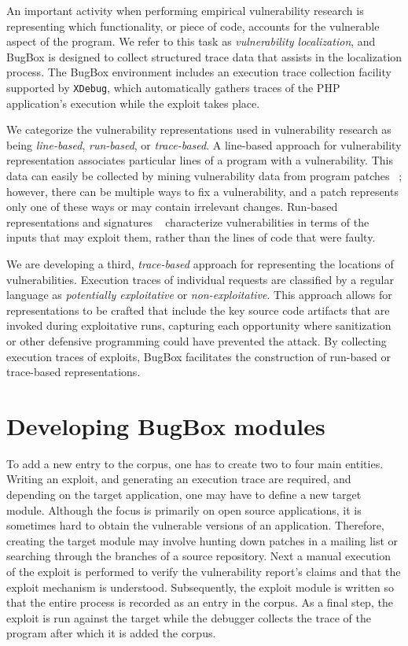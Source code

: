 \documentclass[letterpaper,twocolumn,10pt]{article}
\begin{document}
An important activity when performing empirical vulnerability research is representing which functionality, or piece of code, accounts for the vulnerable aspect of the program. We refer to this task as \emph{vulnerability localization}, and BugBox is designed to collect structured trace data that assists in the localization process. The BugBox environment includes an execution trace collection facility supported by \texttt{XDebug}, which automatically gathers traces of the PHP application's execution while the exploit takes place.

We categorize the vulnerability representations used in vulnerability research as being \textit{line-based}, \textit{run-based}, or \textit{trace-based}. A line-based approach for vulnerability representation associates particular lines of a program with a vulnerability. This data can easily be collected by mining vulnerability data from program patches ~\cite{4630094}; however, there can be multiple ways to fix a vulnerability, and a patch represents only one of these ways or may contain irrelevant changes.  Run-based representations and signatures ~\cite{Song:2008:BNA:1496255.1496257} characterize vulnerabilities in terms of the inputs that may exploit them, rather than the lines of code that were faulty.

We are developing a third, \textit{trace-based} approach for representing the locations of vulnerabilities. Execution traces of individual requests are classified by a regular language as \emph{potentially exploitative} or \emph{non-exploitative}. This approach allows for representations to be crafted that include the key source code artifacts that are invoked during exploitative runs, capturing each opportunity where sanitization or other defensive programming could have prevented the attack. By collecting execution traces of exploits, BugBox facilitates the construction of run-based or trace-based representations.

\section{Developing BugBox modules}

To add a new entry to the corpus, one has to create two to four main entities. Writing an exploit, and generating an execution trace are required, and depending on the target application, one may have to define a new target module.  Although the focus is primarily on open source applications, it is sometimes hard to obtain the vulnerable versions of an application. Therefore, creating the target module may involve hunting down patches in a mailing list or searching through the branches of a source repository. Next a manual execution of the exploit is performed to verify the vulnerability report's claims and that the exploit mechanism is understood. Subsequently, the exploit module is written so that the entire process is recorded as an entry in the corpus. As a final step, the exploit is run against the target while the debugger collects the trace of the program after which it is added the corpus.\par
\end{document}

